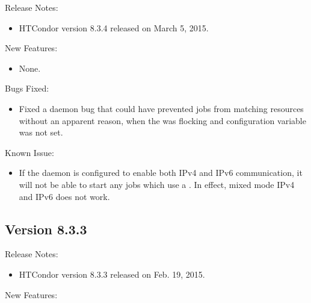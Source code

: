 \noindent Release Notes:

\begin{itemize}

\item HTCondor version 8.3.4 released on March 5, 2015.

\end{itemize}


\noindent New Features:

\begin{itemize}

\item None.

\end{itemize}

\noindent Bugs Fixed:

\begin{itemize}

\item Fixed a  daemon bug
that could have prevented jobs from matching resources
without an apparent reason,
when the  was flocking
and configuration variable  was not set.

\end{itemize}

\noindent Known Issue:
\begin{itemize}
\item If the  daemon is configured to enable both
IPv4 and IPv6 communication,
it will not be able to start any jobs which use a .
In effect, mixed mode IPv4 and IPv6 does not work.
\end{itemize}
\subsection*{\label{sec:New-8-3-3}Version 8.3.3}

\noindent Release Notes:

\begin{itemize}

\item HTCondor version 8.3.3 released on Feb. 19, 2015.

\end{itemize}


\noindent New Features:

